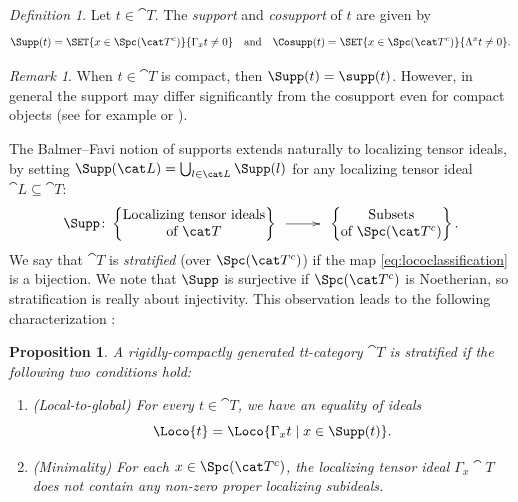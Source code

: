\documentclass{amsart}%
\numberwithin{equation}{section}%
\newtheorem{Prop}[equation]{Proposition}
\theoremstyle{remark}
\newtheorem{Def}[equation]{Definition}
\newtheorem{Rem}[equation]{Remark}
\newcounter{enum-resume-hack}
\begin{document}
\begin{Def}
Let $t \in \cat T$. The \emph{support} and \emph{cosupport} of $t$ are given by
\[
\Supp(t) = \SET{x \in \Spc(\cat T^c)}{\Gamma_{x}t \neq 0} \quad \text{and} \quad \Cosupp(t) = \SET{x \in \Spc(\cat T^c)}{\Lambda^{x}t \neq 0}.
\]
\end{Def}

\begin{Rem}
When $t \in \cat T$ is compact, then $\Supp(t) = \supp(t)$. However, in general the support may differ significantly from the cosupport even for compact objects (see for example \cite[Ex.~11.1]{BIK_cosupport} or \cite{bchs1}). 
\end{Rem}

The Balmer--Favi notion of supports extends naturally to localizing tensor ideals, by setting $\Supp(\cat L) = \bigcup_{l\in\cat L}\Supp(l)$ for any localizing tensor ideal $\cat L \subseteq \cat T$: 
\begin{equation}\label{eq:lococlassification}
\Supp\colon\begin{Bmatrix}
\text{Localizing tensor ideals} \\
\text{of } \cat T
\end{Bmatrix} 
\xymatrix@C=2pc{ \ar[r] &}
\begin{Bmatrix}
\text{Subsets}  \\
\text{of } \Spc(\cat T^c)
\end{Bmatrix}.
\end{equation}
We say that $\cat T$ is \emph{stratified} (over $\Spc(\cat T^c)$) if the map \eqref{eq:lococlassification} is a bijection. We note that $\Supp$ is surjective if $\Spc(\cat T^c)$ is Noetherian, so stratification is really about injectivity. This observation leads to the following characterization \cite[Thm.~4.1]{bhs1}:

\begin{Prop}
A rigidly-compactly generated tt-category $\cat T$ is stratified if the following two conditions hold:
    \begin{enumerate}
        \item (Local-to-global) For every $t \in \cat T$, we have an equality of ideals
            \[ 
            \Loco{t} = \Loco{\Gamma_xt \mid x \in \Supp(t)}.
            \]
        \item (Minimality) For each $x \in \Spc(\cat T^c)$, the localizing tensor ideal $\Gamma_x\cat T$ does not contain any non-zero proper localizing subideals. 
    \end{enumerate}
\end{Prop}
\end{document}
